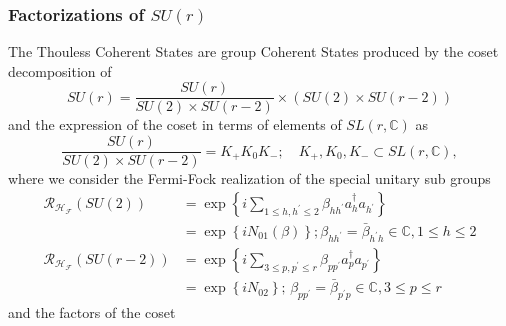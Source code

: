 \documentclass[aps,preprint]{revtex4}%
\begin{document}
\subsubsection{Factorizations of $SU\left(  r\right)  $}

The Thouless Coherent States are group Coherent States produced by the coset
decomposition of
\begin{equation}
SU\left(  r\right)  =\frac{SU\left(  r\right)  }{SU\left(  2\right)  \times
SU\left(  r-2\right)  }\times\left(  SU\left(  2\right)  \times SU\left(
r-2\right)  \right)
\end{equation}
and the expression of the coset in terms of elements of $SL\left(
r,\mathbb{C}\right)  $ as
\begin{equation}
\frac{SU\left(  r\right)  }{SU\left(  2\right)  \times SU\left(  r-2\right)
}=K_{+}K_{0}K_{-};\quad K_{+},K_{0},K_{-}\subset SL\left(  r,\mathbb{C}%
\right)  ,
\end{equation}
where we consider the Fermi-Fock realization of the special unitary sub
groups
\begin{align}
\mathcal{R}_{\mathcal{H}_{\mathcal{F}}}\left(  SU\left(  2\right)  \right)
&  =\exp\left\{  i\sum\limits_{1\leq h,h^{\prime}\leq2}\beta_{hh^{\prime}%
}a_{h}^{\dagger}a_{h^{\prime}}\right\} \nonumber\\
&  =\exp\left\{  iN_{01}\left(  \beta\right)  \right\}  ;\beta_{hh^{\prime}%
}=\bar{\beta}_{h^{\prime}h}\in\mathbb{C},1\leq h\leq2\nonumber\\
\mathcal{R}_{\mathcal{H}_{\mathcal{F}}}\left(  SU\left(  r-2\right)  \right)
&  =\exp\left\{  i\sum\limits_{3\leq p,p^{\prime}\leq r}\beta_{pp^{\prime}%
}a_{p}^{\dagger}a_{p^{\prime}}\right\} \nonumber\\
&  =\exp\left\{  iN_{02}\right\}  ;\,\beta_{pp^{\prime}}=\bar{\beta
}_{p^{\prime}p}\in\mathbb{C},3\leq p\leq r
\end{align}
and the factors of the coset%
\end{document}
